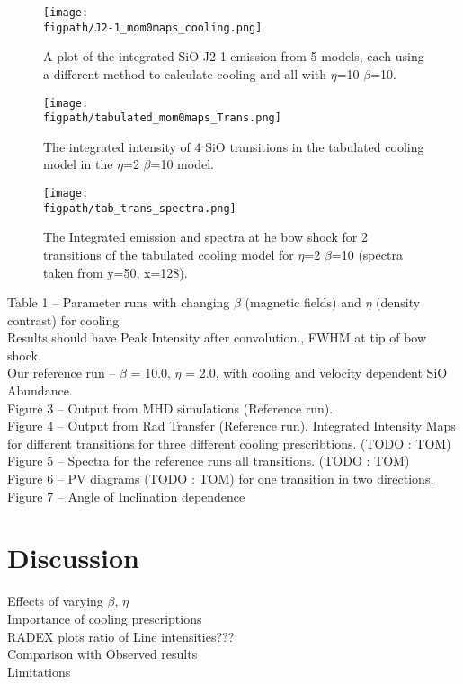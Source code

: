 \documentclass[useAMS,usenatbib,letters]{mn2e}
\newcommand{\figpath}{PFIGS/}
\begin{document}
\begin{figure}
 \texttt{[image: \\figpath/J2-1\_mom0maps\_cooling.png]}
 \caption{A plot of the integrated SiO J2-1 emission from 5 models, each using a different method to calculate cooling and all with $\eta$=10 $\beta$=10.}
\label{cooling2-1}
\end{figure}

\begin{figure*}
 \texttt{[image: \\figpath/tabulated\_mom0maps\_Trans.png]}
 \caption{The integrated intensity of 4 SiO transitions in the tabulated cooling model in the $\eta$=2 $\beta$=10 model.}
\label{tabulatedTrans}
\end{figure*}

\begin{figure}
 \texttt{[image: \\figpath/tab\_trans\_spectra.png]}
 \caption{The Integrated emission and spectra at he bow shock for 2 transitions of the tabulated cooling model for $\eta$=2 $\beta$=10 (spectra taken from y=50, x=128).}
\label{grid}
\end{figure}





Table 1 -- Parameter runs with changing $\beta$ (magnetic fields) and
$\eta$ (density contrast) for cooling \\
Results should have Peak Intensity after convolution., FWHM at tip of
bow shock.\\
Our reference run -- $\beta$ = 10.0, $\eta$ = 2.0, with cooling and
velocity dependent SiO Abundance. \\
Figure 3 -- Output from MHD simulations (Reference run).\\
Figure 4 -- Output from Rad Transfer (Reference run). Integrated
Intensity Maps for different transitions for three different cooling prescribtions. (TODO : TOM)\\
Figure 5 -- Spectra for the reference runs all transitions. (TODO :
TOM)\\
Figure 6 -- PV diagrams (TODO : TOM) for one transition in two directions.
Figure 7 -- Angle of Inclination dependence 
 

\section{Discussion}
Effects of varying $\beta$, $\eta$\\
Importance of cooling prescriptions\\
RADEX plots ratio of Line intensities???\\
Comparison with Observed results \\
Limitations\\
\end{document}

